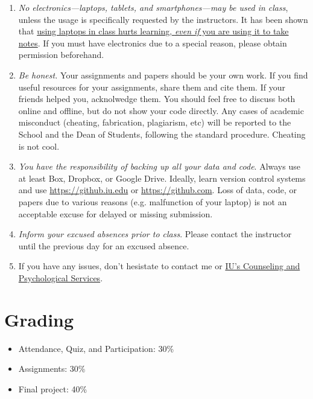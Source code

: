 \documentclass[11pt,article,oneside]{memoir} %
\begin{document}
\begin{enumerate}
\item \emph{No electronics---laptops, tablets, and smartphones---may be used in
class}, unless the usage is specifically requested by the instructors.  It has
been shown that
\href{http://www.scientificamerican.com/article/a-learning-secret-don-t-take-notes-with-a-laptop/}{using
laptops in class hurts learning, \emph{even if} you are using it to take
notes}.  If you must have electronics due to a special reason, please obtain
permission beforehand. 

\item \emph{Be honest.} Your assignments and papers should be your own work.
If you find useful resources for your assignments, share them and cite them. If
your friends helped you, acknolwedge them. You should feel free to discuss both
online and offline, but do not show your code directly.  Any cases of academic
misconduct (cheating, fabrication, plagiarism, etc) will be reported to the
School and the Dean of Students, following the standard procedure. Cheating is
not cool. 

\item \emph{You have the responsibility of backing up all your data and code}.
Always use at least Box, Dropbox, or Google Drive. Ideally, learn version
control systems and use \url{https://github.iu.edu} or
\url{https://github.com}. Loss of data, code, or papers due to various reasons
(e.g. malfunction of your laptop) is not an acceptable excuse for delayed or
missing submission. 

\item \emph{Inform your excused absences prior to class}. Please contact the
instructor until the previous day for an excused absence.  

\item If you have any issues, don't hesistate to contact me or
\href{http://healthcenter.indiana.edu/counseling/index.shtml}{IU's Counseling
and Psychological Services}. 


\end{enumerate}%
\section{Grading}%
\label{sec:grading_tentative_}

\begin{itemize}%

\item Attendance, Quiz, and Participation: 30\%

\item Assignments: 30\%

\item Final project: 40\%

\end{itemize}%
\clearpage
\end{document}
